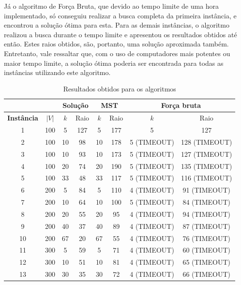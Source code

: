 Já o algoritmo de Força Bruta, que devido ao tempo limite de uma hora implementado, só conseguiu realizar a busca completa da primeira instância, e encontrou a solução ótima para esta. Para as demais instâncias, o algoritmo realizou a busca durante o tempo limite e apresentou os resultados obtidos até então. Estes raios obtidos, são, portanto, uma solução aproximada também. Entretanto, vale ressaltar que, com o uso de computadores mais potentes ou maior tempo limite, a solução ótima poderia ser encontrada para todas as instâncias utilizando este algoritmo. 


\begin{table}[h]
	\centering
	\caption{\hspace{0.1cm} Resultados obtidos para os algoritmos}
	\vspace{-0.3cm} %
	\label{tab:tabela1}
	\begin{tabular}{c|c|c|c|c|c|c|c}
		\hline
		 \multicolumn{2}{c|}{ }& \multicolumn{2}{c|}{Solução} & \multicolumn{2}{c|}{MST} & \multicolumn{2}{c|}{Força bruta}\\ 
		\hline
		\textbf{Instância} & $\vert V \vert$ & $k$ & Raio & $k$ & Raio & $k$ & Raio  \\
		\hline
		1 & 100 & 5 & 127 & 5 & 177 & 5 & 127 \\
		2 & 100 & 10 & 98 & 10 & 178 & 5 (TIMEOUT) & 128 (TIMEOUT)\\
		3 & 100 & 10 & 93 & 10 & 173 & 5 (TIMEOUT) & 127 (TIMEOUT)\\
		4 & 100 & 20 & 74 & 20 & 190 & 5 (TIMEOUT) & 135 (TIMEOUT)\\
		5 & 100 & 33 & 48 & 33 & 117 & 5 (TIMEOUT) & 116 (TIMEOUT)\\
		6 & 200 & 5 & 84 & 5 & 110 & 4 (TIMEOUT) & 91 (TIMEOUT)\\
		7 & 200 & 10 & 64 & 10 & 100 & 5 (TIMEOUT) & 84 (TIMEOUT)\\
		8 & 200 & 20 & 55 & 20 & 95 & 4 (TIMEOUT) & 94 (TIMEOUT)\\
		9 & 200 & 40 & 37 & 40 & 89 & 4 (TIMEOUT) & 87 (TIMEOUT)\\
		10 & 200 & 67 & 20 & 67 & 55 & 4 (TIMEOUT) & 76 (TIMEOUT) \\
		11 & 300 & 5 & 59 & 5 & 71 & 4 (TIMEOUT) & 60 (TIMEOUT)\\
		12 & 300 & 10 & 51 & 10 & 81 & 4 (TIMEOUT) & 65 (TIMEOUT)\\
		13 & 300 & 30 & 35 & 30 & 72 & 4 (TIMEOUT) & 66 (TIMEOUT)\\

\end{tabular}
\end{table}
